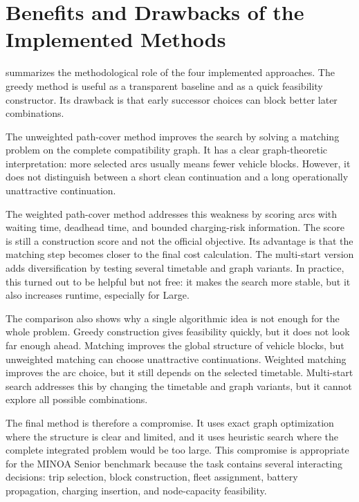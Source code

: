 \section{Benefits and Drawbacks of the Implemented Methods}
\label{sec:discussion-methods}

 summarizes the methodological role of
the four implemented approaches.  The greedy method is useful as a transparent
baseline and as a quick feasibility constructor.  Its drawback is that early
successor choices can block better later combinations.

The unweighted path-cover method improves the search by solving a matching
problem on the complete compatibility graph.  It has a clear graph-theoretic
interpretation: more selected arcs usually means fewer vehicle blocks.  However,
it does not distinguish between a short clean continuation and a long
operationally unattractive continuation.

The weighted path-cover method addresses this weakness by scoring arcs with
waiting time, deadhead time, and bounded charging-risk information.  The score
is still a construction score and not the official objective.  Its advantage is
that the matching step becomes closer to the final cost calculation.  The
multi-start version adds diversification by testing several timetable and graph
variants.  In practice, this turned out to be helpful but not free: it makes the
search more stable, but it also increases runtime, especially for Large.

The comparison also shows why a single algorithmic idea is not enough for the
whole problem.  Greedy construction gives feasibility quickly, but it does not
look far enough ahead.  Matching improves the global structure of vehicle
blocks, but unweighted matching can choose unattractive continuations.  Weighted
matching improves the arc choice, but it still depends on the selected
timetable.  Multi-start search addresses this by changing the timetable and
graph variants, but it cannot explore all possible combinations.

The final method is therefore a compromise.  It uses exact graph optimization
where the structure is clear and limited, and it uses heuristic search where
the complete integrated problem would be too large.  This compromise is
appropriate for the MINOA Senior benchmark because the task contains several
interacting decisions: trip selection, block construction, fleet assignment,
battery propagation, charging insertion, and node-capacity feasibility.

